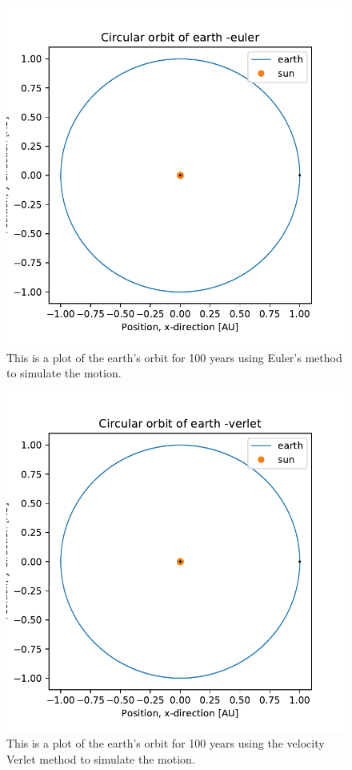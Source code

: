 \begin{figure}[H]
\includegraphics[width=1.1\linewidth]{../results/plots/plotof-earthsun-euler.pdf}\caption{This is a plot of the earth's orbit for 100 years using Euler's method to simulate the motion.}\label{fig:earth-sun-euler}
\end{figure}		
	
\begin{figure}[H]
\includegraphics[width=1.1\linewidth]{../results/plots/plotof-earthsun-verlet.pdf}\caption{This is a plot of the earth's orbit for 100 years using the velocity Verlet method to simulate the motion.}\label{fig:earth-sun-verlet}
\end{figure}	

